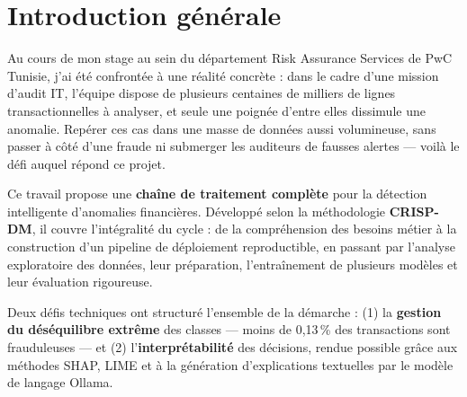 \documentclass[12pt,a4paper,twoside]{report}
\begin{document}
\newpage
{}

\chapter*{Introduction générale}

Au cours de mon stage au sein du département Risk Assurance Services de PwC Tunisie,
j'ai été confrontée à une réalité concrète : dans le cadre d'une mission d'audit IT,
l'équipe dispose de plusieurs centaines de milliers de lignes transactionnelles à analyser,
et seule une poignée d'entre elles dissimule une anomalie. Repérer ces cas dans une masse
de données aussi volumineuse, sans passer à côté d'une fraude ni submerger les auditeurs
de fausses alertes --- voilà le défi auquel répond ce projet.

Ce travail propose une \textbf{chaîne de traitement complète} pour la détection intelligente
d'anomalies financières. Développé selon la méthodologie \textbf{CRISP-DM}, il couvre
l'intégralité du cycle : de la compréhension des besoins métier à la construction d'un
pipeline de déploiement reproductible, en passant par l'analyse exploratoire des données,
leur préparation, l'entraînement de plusieurs modèles et leur évaluation rigoureuse.

Deux défis techniques ont structuré l'ensemble de la démarche : (1) la \textbf{gestion
du déséquilibre extrême} des classes --- moins de 0,13\,\% des transactions sont
frauduleuses --- et (2) l'\textbf{interprétabilité} des décisions, rendue possible grâce
aux méthodes SHAP, LIME et à la génération d'explications textuelles par le modèle de
langage Ollama.
\end{document}
